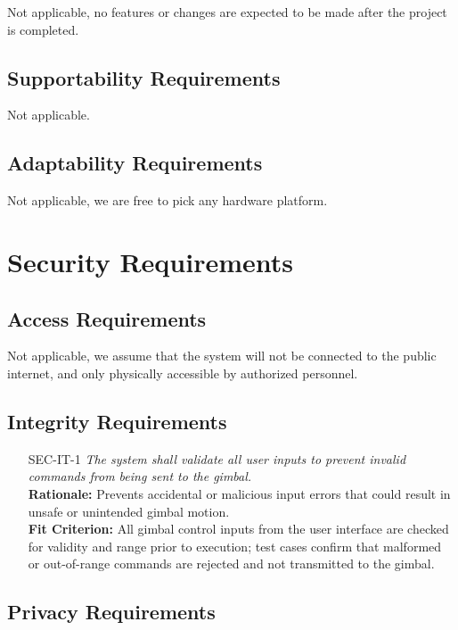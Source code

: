 \documentclass[12pt]{article}
\begin{document}
Not applicable, no features or changes are expected to be made after the
project is completed.

\subsection{Supportability Requirements}

Not applicable.

\subsection{Adaptability Requirements}

Not applicable, we are free to pick any hardware platform.

\section{Security Requirements}
\subsection{Access Requirements}

Not applicable, we assume that the system will not be connected to the public
internet, and only physically accessible by authorized personnel.

\subsection{Integrity Requirements}
\begin{itemize}[leftmargin=*]
  \item[SEC-IT-1] \emph{The system shall validate all user inputs to prevent invalid
          commands from being sent to the gimbal.}\\ \textbf{Rationale:} Prevents
        accidental or malicious input errors that could result in unsafe or unintended
        gimbal motion.\\ \textbf{Fit Criterion:} All gimbal control inputs from the
        user interface are checked for validity and range prior to execution; test
        cases confirm that malformed or out-of-range commands are rejected and not
        transmitted to the gimbal.
\end{itemize}

\subsection{Privacy Requirements}
\end{document}
